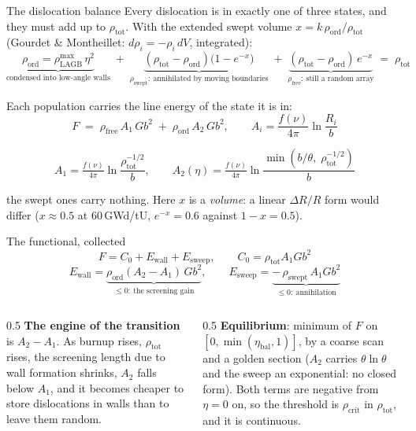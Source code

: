 \documentclass[10pt,aspectratio=169]{beamer}
\begin{document}
\begin{frame}{The dislocation balance}
  Every dislocation is in exactly one of three states, and they must \alert{add up to
  $\rho_{\text{tot}}$}. With the extended swept volume $x = k\,\rho_{\text{ord}}/\rho_{\text{tot}}$
  (Gourdet \& Montheillet: $d\rho_i = -\rho_i\,dV$, integrated):
  \[
    \underbrace{\rho_{\text{ord}} = \rho^{\max}_{\text{LAGB}}\,\eta^{2}}_{\text{condensed into low-angle walls}}
    \;+\;
    \underbrace{(\rho_{\text{tot}}-\rho_{\text{ord}})\big(1-e^{-x}\big)}_{\rho_{\text{swept}}:\ \text{annihilated by moving boundaries}}
    \;+\;
    \underbrace{(\rho_{\text{tot}}-\rho_{\text{ord}})\,e^{-x}}_{\rho_{\text{free}}:\ \text{still a random array}}
    \;=\; \rho_{\text{tot}}
  \]

  Each population carries the line energy of the state it is in:
  \[
    F \;=\; \rho_{\text{free}}\,A_1\,G b^2 \;+\; \rho_{\text{ord}}\,A_2\,G b^2,
    \qquad A_i = \frac{f(\nu)}{4\pi}\ln\frac{R_i}{b}
  \]
  \vspace{-0.9em}

  \[ A_1 = \tfrac{f(\nu)}{4\pi}\ln\frac{\rho_{\text{tot}}^{-1/2}}{b},\qquad
     A_2(\eta) = \tfrac{f(\nu)}{4\pi}\ln\frac{\min(b/\theta,\;\rho_{\text{tot}}^{-1/2})}{b} \]

  the swept ones carry nothing. Here $x$ is a \emph{volume}: a linear $\Delta R/R$ form would
  differ ($x \approx 0.5$ at 60\,GWd/tU, $e^{-x}=0.6$ against $1-x=0.5$).
\end{frame}

\begin{frame}{The functional, collected}
  \[
    F = C_0 + E_{\text{wall}} + E_{\text{sweep}},
    \qquad C_0 = \rho_{\text{tot}} A_1 G b^2
  \]
  \[
    E_{\text{wall}} = \underbrace{\rho_{\text{ord}}(A_2 - A_1)\,Gb^2}_{\le 0:\ \text{the screening gain}},
    \qquad
    E_{\text{sweep}} = \underbrace{-\,\rho_{\text{swept}}\, A_1 Gb^2}_{\le 0:\ \text{annihilation}}
  \]

  \vspace{0.5em}
  \begin{columns}[T]
    \begin{column}{0.5\textwidth}
      \textbf{The engine of the transition} is $A_2 - A_1$.
      As burnup rises, $\rho_{\text{tot}}$ rises, the screening length due to wall formation shrinks, $A_2$ falls below $A_1$, and it becomes cheaper to store dislocations in walls than to leave them random.
    \end{column}
    \begin{column}{0.5\textwidth}
      \textbf{Equilibrium}: minimum of $F$ on $[0,\min(\eta_{\text{bal}},1)]$,
      by a coarse scan and a golden section ($A_2$ carries $\theta\ln\theta$ and the sweep an
      exponential: no closed form). Both terms are negative from $\eta=0$ on, so the threshold
      is $\rho_{\text{crit}}$ in $\rho_{\text{tot}}$, and it is continuous.
    \end{column}
  \end{columns}
\end{frame}
\end{document}
